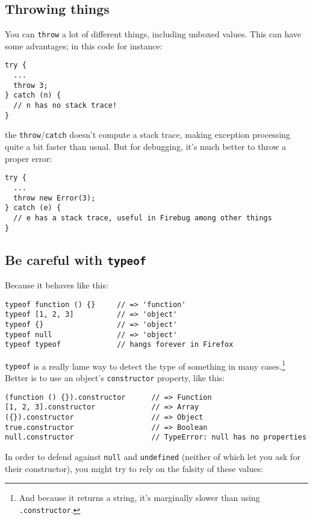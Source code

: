 \documentclass{article}
\begin{document}
\subsection {Throwing things}
    You can \verb|throw| a lot of different things, including unboxed values. This can have some advantages; in this code for instance:

\begin{verbatim}
try {
  ...
  throw 3;
} catch (n) {
  // n has no stack trace!
}
\end{verbatim}

    \noindent the \verb|throw|/\verb|catch| doesn't compute a stack trace, making exception processing quite a bit faster than usual. But for debugging, it's much better to throw a proper
    error:

\begin{verbatim}
try {
  ...
  throw new Error(3);
} catch (e) {
  // e has a stack trace, useful in Firebug among other things
}
\end{verbatim}

\subsection {Be careful with {\tt typeof}}
    \label{sec:careful-with-typeof}
    Because it behaves like this:

\begin{verbatim}
typeof function () {}     // => 'function'
typeof [1, 2, 3]          // => 'object'
typeof {}                 // => 'object'
typeof null               // => 'object'
typeof typeof             // hangs forever in Firefox
\end{verbatim}

    {\tt typeof} is a really lame way to detect the type of something in many cases.\footnote{And because it returns a string, it's marginally slower than using {\tt .constructor}.} Better is
    to use an object's \verb|constructor| property, like this:

\begin{verbatim}
(function () {}).constructor      // => Function
[1, 2, 3].constructor             // => Array
({}).constructor                  // => Object
true.constructor                  // => Boolean
null.constructor                  // TypeError: null has no properties
\end{verbatim}

    In order to defend against \verb|null| and \verb|undefined| (neither of which let you ask for their constructor), you might try to rely on the falsity of these values:
\end{document}
